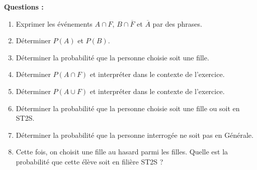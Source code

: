 \documentclass[12pt]{article}
\theoremstyle{break}
\begin{document}
\textbf{Questions :}
\begin{enumerate}
    \item Exprimer les événements $A \cap F$, $B \cap \overline{F}$ et $\overline{A}$ par des phrases.
    \item Déterminer $P(A)$ et $P(B)$.
    \item Déterminer la probabilité que la personne choisie soit une fille.
    \item Déterminer $P(A \cap F)$ et interpréter dans le contexte de l'exercice.
    \item Déterminer $P(A \cup F)$ et interpréter dans le contexte de l'exercice.
    \item Déterminer la probabilité que la personne choisie soit une fille ou soit en ST2S.
    \item Déterminer la probabilité que la personne interrogée ne soit pas en Générale.
    \item Cette fois, on choisit une fille au hasard parmi les filles. Quelle est la probabilité que cette élève soit en filière ST2S ?
\end{enumerate}
\end{document}
